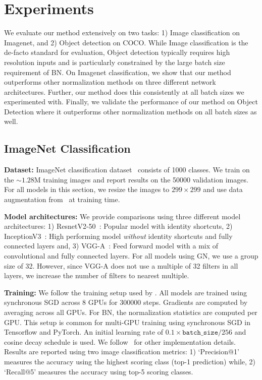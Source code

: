 \documentclass[10pt,twocolumn,letterpaper]{article}
\newcommand{\batchnorm}{BN}
\begin{document}
\section{Experiments}
We evaluate our method extensively on two tasks: 1) Image classification on Imagenet, and 2) Object detection on COCO. While Image classification is the de-facto standard for evaluation, Object detection typically requires high resolution inputs and is particularly constrained by the large batch size requirement of \batchnorm{}. On Imagenet classification, we show that our method outperforms other normalization methods on three different network architectures. Further, our method does this consistently at all batch sizes we experimented with. Finally, we validate the performance of our method on Object Detection where it outperforms other normalization methods on all batch sizes as well.


\subsection{ImageNet Classification} \label{sec:imagenet}

\noindent
\textbf{Dataset:} ImageNet classification dataset~\cite{imagenet} consists  of 1000 classes. We train on the ${\sim}1.28$M training images and report results on the 50000 validation images. For all models in this section, we resize the images to $299{\times}299$ and use data augmentation from~\cite{szegedy2017inception} at training time.

\medskip
\noindent
\textbf{Model architectures:} We provide comparisons using three different model architectures: 1) ResnetV2-50~\cite{resnetsv2}: Popular model with identity shortcuts, 2) InceptionV3~\cite{szegedy2016rethinking}: High performing model \emph{without} identity shortcuts and fully connected layers and, 3) VGG-A~\cite{vggnet}: Feed forward model with a mix of convolutional and fully connected layers. For all models using GN, we use a group size of 32. However, since VGG-A does not use a multiple of 32 filters in all layers, we increase the number of filters to nearest multiple.

\medskip
\noindent
\textbf{Training:}
We follow the training setup used by \citet{resnets}. All models are trained using synchronous SGD across 8 GPUs for 300000 steps. Gradients are computed by averaging across all GPUs. For BN, the normalization statistics are computed per GPU. This setup is common for multi-GPU training using synchronous SGD in Tensorflow and PyTorch.
An initial learning rate of $0.1{\times}\texttt{batch\_size}/256$ and cosine decay schedule is used. We follow~\cite{resnets, resnetsv2} for other implementation details. Results are reported using two image classification metrics: 1) `Precision@1' measures the accuracy using the highest scoring class (top-1 prediction) while, 2) `Recall@5' measures the accuracy using top-5 scoring classes.
\end{document}
